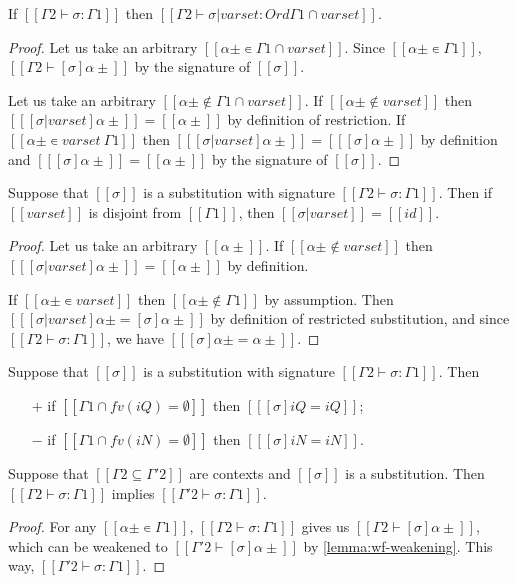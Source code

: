\begin{lemma}
  \label{lemma:subst-restr-sig}
  If $[[Γ2 ⊢ σ : Γ1]]$ then $[[Γ2 ⊢ σ|varset : Ord {Γ1} ∩ varset]]$.
\end{lemma}
\begin{proof}
  Let us take an arbitrary $[[α± ∊ {Γ1} ∩ varset]]$.
  Since $[[α± ∊ {Γ1}]]$, $[[Γ2 ⊢ [σ]α± ]]$ by the signature of $[[σ]]$.

  Let us take an arbitrary $[[α± ∉ {Γ1} ∩ varset]]$.
  If $[[α± ∉ varset]]$ then $[[ [σ|varset]α± ]] = [[α±]]$ by definition
  of restriction. 
  If $[[α± ∊ varset \ {Γ1}]]$ then $[[ [σ|varset]α± ]] = [[ [σ]α± ]]$ by definition
  and $[[ [σ]α± ]] = [[α±]]$ by the signature of $[[σ]]$.
\end{proof}

\begin{lemma}
  Suppose that $[[σ]]$ is a substitution with signature $[[Γ2 ⊢ σ : Γ1]]$. 
  Then if $[[varset]]$ is disjoint from $[[Γ1]]$, 
  then $[[ σ|varset]] = [[ id ]]$. 
\end{lemma}
\begin{proof}
  Let us take an arbitrary $[[α±]]$.
  If $[[α± ∉ varset]]$ then $[[ [σ|varset]α±]] = [[α±]]$ by definition.

  If $[[α± ∊ varset]]$ then $[[α± ∉ {Γ1}]]$ by assumption.
  Then $[[ [σ|varset]α± = [σ]α±]]$ by definition of restricted substitution, and
  since $[[Γ2 ⊢ σ : Γ1]]$, we have $[[ [σ]α± = α± ]]$.
\end{proof}

\begin{corollary}
  \label{corollary:subst-disj}
  Suppose that $[[σ]]$ is a substitution with signature $[[Γ2 ⊢ σ : Γ1]]$. Then
  \begin{itemize}
    \item [$+$] if $[[{Γ1} ∩ fv(iQ) = ∅]]$ then $[[ [σ] iQ = iQ]]$;
    \item [$-$] if $[[{Γ1} ∩ fv(iN) = ∅]]$ then $[[ [σ] iN = iN]]$.
  \end{itemize}
\end{corollary}

\begin{lemma}
  \label{lemma:subst-range-weakening}
  Suppose that $[[{Γ2} ⊆ {Γ'2}]]$ are contexts and 
  $[[σ]]$ is a substitution.
  Then $[[Γ2 ⊢ σ : Γ1]]$ implies $[[Γ'2 ⊢ σ : Γ1]]$.
\end{lemma}
\begin{proof}
  For any $[[α± ∊ {Γ1}]]$, 
  $[[Γ2 ⊢ σ : Γ1]]$ gives us  $[[ Γ2 ⊢ [σ]α± ]]$, which can be
  weakened to $[[ Γ'2 ⊢ [σ]α± ]]$ by \cref{lemma:wf-weakening}. 
  This way, $[[Γ'2 ⊢ σ : Γ1]]$.
\end{proof}

